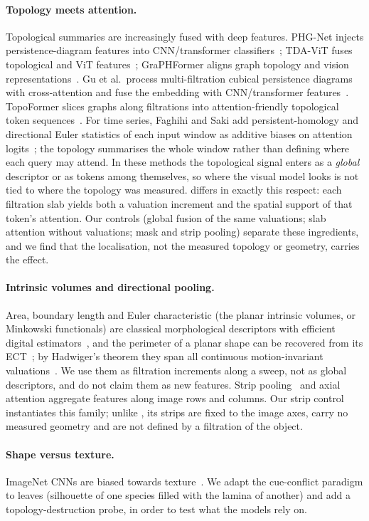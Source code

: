\paragraph{Topology meets attention.} Topological summaries are increasingly fused with deep
features. PHG-Net injects persistence-diagram features into CNN/transformer classifiers~\citep{phgnet2023};
TDA-ViT fuses topological and ViT features~\citep{tdavit2026}; GraPHFormer aligns graph topology
and vision representations~\citep{shah2026graphformer}. Gu et al.\ process multi-filtration cubical
persistence diagrams with cross-attention and fuse the embedding with CNN/transformer
features~\citep{gu2026multifiltration}. TopoFormer slices graphs along filtrations into
attention-friendly topological token sequences~\citep{uddin2026topoformer}. For time series, Faghihi and Saki add persistent-homology and directional Euler
statistics of each input window as additive biases on attention logits~\citep{faghihi2026topoattn}; the
topology summarises the whole window rather than defining where each query may attend. In these methods the
topological signal enters as a \emph{global} descriptor or as tokens among themselves, so where the
visual model looks is not tied to where the topology was measured. \SVA{} differs in exactly this
respect: each filtration slab yields both a valuation increment and the spatial support of that token's
attention. Our controls (global fusion of the same valuations; slab attention without valuations;
mask and strip pooling) separate these ingredients, and we find that the localisation, not the
measured topology or geometry, carries the effect.

\paragraph{Intrinsic volumes and directional pooling.} Area, boundary length and Euler characteristic
(the planar intrinsic volumes, or Minkowski functionals) are classical morphological descriptors with
efficient digital estimators~\citep{mecke1994,legland2007minkowski}, and the perimeter of a planar shape
can be recovered from its ECT~\citep{gacias2026convexect}; by Hadwiger's theorem they span all
continuous motion-invariant valuations~\citep{hadwiger1957,klain1997}. We use them as filtration
increments along a sweep, not as global descriptors, and do not claim them as new features. Strip
pooling~\citep{hou2020strip} and axial attention aggregate features along image rows and columns.
Our strip control instantiates this family; unlike \SVA{}, its strips are fixed to the image axes,
carry no measured geometry and are not defined by a filtration of the object.

\paragraph{Shape versus texture.} ImageNet CNNs are biased towards texture~\citep{geirhos2019texture}.
We adapt the cue-conflict paradigm to leaves (silhouette of one species filled with the lamina of
another) and add a topology-destruction probe, in order to test what the models rely on.
